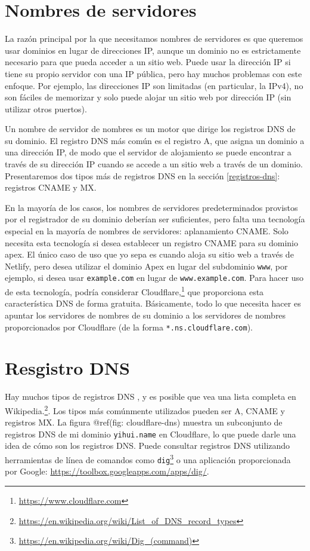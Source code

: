 \documentclass[12pt,]{krantz}
\renewcommand{\href}[2]{#2\footnote{\url{#1}}}
\theoremstyle{definition}
\theoremstyle{definition}
\theoremstyle{definition}
\theoremstyle{remark}
\begin{document}
\hypertarget{nombres-de-servidores}{%
\section{Nombres de servidores}\label{nombres-de-servidores}}

La razón principal por la que necesitamos nombres de servidores
 es que queremos usar dominios en lugar de
direcciones IP, aunque un dominio no es estrictamente necesario para que
pueda acceder a un sitio web. Puede usar la dirección IP si tiene su
propio servidor con una IP pública, pero hay muchos problemas con este
enfoque. Por ejemplo, las direcciones IP son limitadas (en particular,
la IPv4), no son fáciles de memorizar y solo puede alojar un sitio web
por dirección IP (sin utilizar otros puertos).

Un nombre de servidor de nombres es un motor que dirige los registros
DNS de su dominio. El registro DNS más común es el registro A, que
asigna un dominio a una dirección IP, de modo que el servidor de
alojamiento se puede encontrar a través de su dirección IP cuando se
accede a un sitio web a través de un dominio. Presentaremos dos tipos
más de registros DNS en la sección \ref{registros-dns}: registros CNAME
y MX.

En la mayoría de los casos, los nombres de servidores predeterminados
provistos por el registrador de su dominio deberían ser suficientes,
pero falta una tecnología especial en la mayoría de nombres de
servidores: aplanamiento CNAME. Solo necesita esta tecnología si desea
establecer un registro CNAME para su dominio apex. El único caso de uso
que yo sepa es cuando aloja su sitio web a través de Netlify, pero desea
utilizar el dominio Apex en lugar del subdominio \texttt{www}, por
ejemplo, si desea usar \texttt{example.com} en lugar de
\texttt{www.example.com}. Para hacer uso de esta tecnología, podría
considerar \href{https://www.cloudflare.com}{Cloudflare,} que
proporciona esta característica DNS de forma gratuita. Básicamente, todo
lo que necesita hacer es apuntar los servidores de nombres de su dominio
a los servidores de nombres proporcionados por Cloudflare (de la forma
\texttt{*.ns.cloudflare.com}).

\hypertarget{resgistro-dns}{%
\section{Resgistro DNS}\label{resgistro-dns}}

Hay muchos tipos de registros DNS , y es posible
que vea una lista completa en
\href{https://en.wikipedia.org/wiki/List_of_DNS_record_types}{Wikipedia.}.
Los tipos más comúnmente utilizados pueden ser A, CNAME y registros MX.
La figura @ref(fig: cloudflare-dns) muestra un subconjunto de registros
DNS de mi dominio \texttt{yihui.name} en Cloudflare, lo que puede darle
una idea de cómo son los registros DNS. Puede consultar registros DNS
utilizando herramientas de línea de comandos como
\href{https://en.wikipedia.org/wiki/Dig_(command)}{\texttt{dig}} o una
aplicación proporcionada por Google:
\url{https://toolbox.googleapps.com/apps/dig/}.
\end{document}
